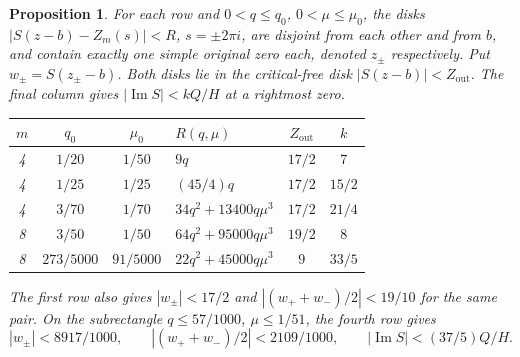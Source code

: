 \documentclass[11pt,reqno]{amsart}
\numberwithin{equation}{section}
\newtheorem{proposition}[theorem]{Proposition}
\theoremstyle{definition}
\theoremstyle{remark}
\renewcommand{\Im}{\operatorname{Im}}
\begin{document}
\begin{proposition}\label{lt:q04mu04}\label{lt:q05mu02}\label{lt:W8}
For each row and $0<q\le q_0$, $0<\mu\le\mu_0$, the disks
$|S(z-b)-Z_m(s)|<R$, $s=\pm2\pi i$, are disjoint from each other
and from $b$, and contain exactly one simple original zero each,
denoted $z_\pm$ respectively.
Put $w_\pm=S(z_\pm-b)$. Both disks lie in the critical-free
disk $|S(z-b)|<Z_{\mathrm{out}}$. The final column gives
$|\Im S|<kQ/H$ at a rightmost zero.
\begin{center}\small
\begin{tabular}{ccclcc}
\toprule
$m$&$q_0$&$\mu_0$&$R(q,\mu)$&$Z_{\mathrm{out}}$&$k$\\\midrule
4&$1/20$&$1/50$&$9q$&$17/2$&$7$\\
4&$1/25$&$1/25$&$(45/4)q$&$17/2$&$15/2$\\
4&$3/70$&$1/70$&$34q^2+13400q\mu^3$&$17/2$&$21/4$\\
8&$3/50$&$1/50$&$64q^2+95000q\mu^3$&$19/2$&$8$\\
8&$273/5000$&$91/5000$&$22q^2+45000q\mu^3$&$9$&$33/5$\\\bottomrule
\end{tabular}
\end{center}
The first row also gives $|w_\pm|<17/2$ and
$|(w_++w_-)/2|<19/10$ for the same pair.
On the subrectangle $q\le57/1000$, $\mu\le1/51$, the fourth row gives
\begin{equation}\label{lt:Q057}
 |w_\pm|<8917/1000,\qquad
 |(w_++w_-)/2|<2109/1000,\qquad |\Im S|<(37/5)Q/H.
\end{equation}
\end{proposition}
\end{document}
